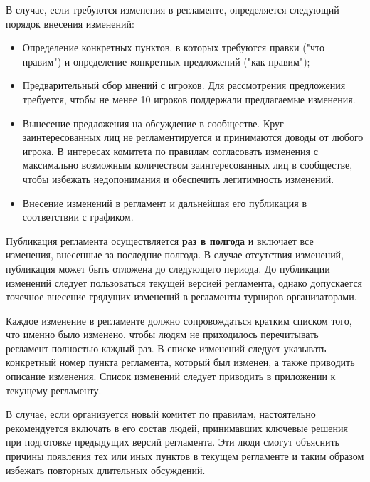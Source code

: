 В случае, если требуются изменения в регламенте, определяется следующий порядок внесения изменений:
\begin{itemize}
	\item Определение конкретных пунктов, в которых требуются правки ("что правим") и определение конкретных предложений ("как правим");
	\item Предварительный сбор мнений с игроков. Для рассмотрения предложения требуется, чтобы не менее 10 игроков поддержали предлагаемые изменения.
	\item Вынесение предложения на обсуждение в сообществе. Круг заинтересованных лиц не регламентируется и принимаются доводы от любого игрока. В интересах комитета по правилам согласовать изменения с максимально возможным количеством заинтересованных лиц в сообществе, чтобы избежать недопонимания и обеспечить легитимность изменений.
	\item Внесение изменений в регламент и дальнейшая его публикация в соответствии с графиком.
\end{itemize}

Публикация регламента осуществляется \textbf{раз в полгода} и включает все изменения, внесенные за последние полгода. В случае отсутствия изменений, публикация может быть отложена до следующего периода. До публикации изменений следует пользоваться текущей версией регламента, однако допускается точечное внесение грядущих изменений в регламенты турниров организаторами.

Каждое изменение в регламенте должно сопровождаться кратким списком того, что именно было изменено, чтобы людям не приходилось перечитывать регламент полностью каждый раз. В списке изменений следует указывать конкретный номер пункта регламента, который был изменен, а также приводить описание изменения. Список изменений следует приводить в приложении к текущему регламенту.

В случае, если организуется новый комитет по правилам, настоятельно рекомендуется включать в его состав людей, принимавших ключевые решения при подготовке предыдущих версий регламента. Эти люди смогут объяснить причины появления тех или иных пунктов в текущем регламенте и таким образом избежать повторных длительных обсуждений.
